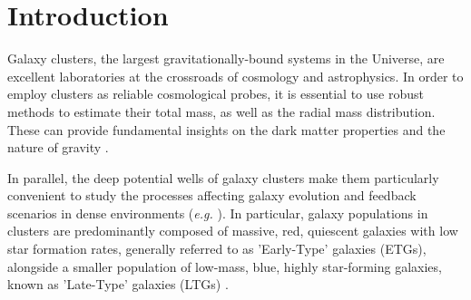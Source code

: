 \documentclass{aa}
\begin{document}


\maketitle


\section{Introduction}
\label{sec:intro}

Galaxy clusters, the largest gravitationally-bound systems in the Universe, are excellent laboratories at the crossroads of cosmology and astrophysics. 
In order to employ clusters as reliable cosmological probes, it is essential to use robust methods to estimate their total mass, as well as the radial mass distribution. These can provide fundamental insights on the dark matter properties \citep[\textit{e.g.}][]{Biviano:2023oyf,Vall_s_P_rez_2025} and the nature of gravity \citep[\textit{e.g.}][]{Pizzuti22,Zamani24}.

In parallel, the deep potential wells of galaxy clusters make them %
particularly convenient to study the processes affecting galaxy evolution and feedback scenarios in dense environments (\textit{e.g.} \citealt{Boselli_2014,Boselli_2022,Sampaio_2024}). In particular, galaxy populations in clusters are predominantly composed of massive, red, quiescent galaxies with low star formation rates, generally referred to as 'Early-Type' galaxies (ETGs), alongside a smaller population of low-mass, blue, highly star-forming galaxies, known as 'Late-Type' galaxies (LTGs) \citep{Dressler_1997, Boselli_2006}.  %
\end{document}
